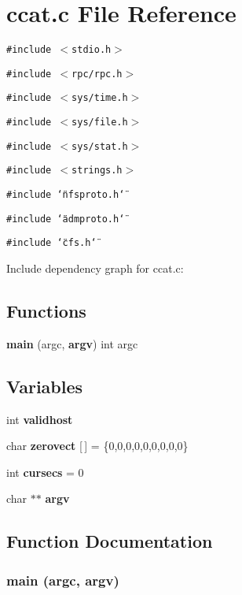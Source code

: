 \section{ccat.c File Reference}
\label{ccat_8c}


{\tt \#include $<$stdio.h$>$}\par
{\tt \#include $<$rpc/rpc.h$>$}\par
{\tt \#include $<$sys/time.h$>$}\par
{\tt \#include $<$sys/file.h$>$}\par
{\tt \#include $<$sys/stat.h$>$}\par
{\tt \#include $<$strings.h$>$}\par
{\tt \#include \char`\"{}nfsproto.h\char`\"{}}\par
{\tt \#include \char`\"{}admproto.h\char`\"{}}\par
{\tt \#include \char`\"{}cfs.h\char`\"{}}\par


Include dependency graph for ccat.c:\subsection*{Functions}
\begin{CompactItemize}
\item 
{\bf main} (argc, {\bf argv}) int argc
\end{CompactItemize}
\subsection*{Variables}
\begin{CompactItemize}
\item 
int {\bf validhost}
\item 
char {\bf zerovect} [$\,$] = \{0,0,0,0,0,0,0,0,0\}
\item 
int {\bf cursecs} = 0
\item 
char $\ast$$\ast$ {\bf argv}
\end{CompactItemize}


\subsection{Function Documentation}
\subsubsection{\setlength{\rightskip}{0pt plus 5cm}main (argc, {\bf argv})}\label{ccat_8c_a4}




